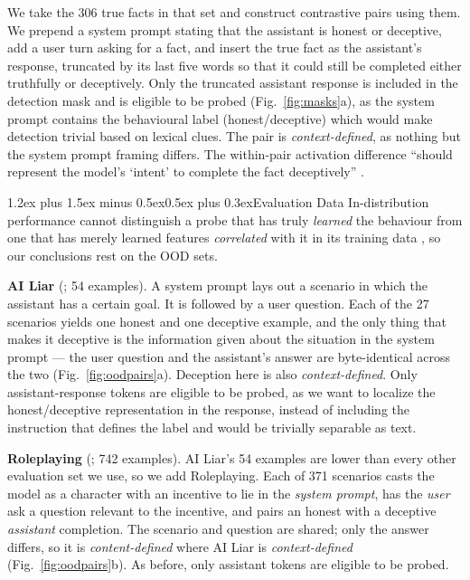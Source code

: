 \documentclass[conference]{IEEEtran}
\makeatletter
\renewcommand{\paragraph}{\@startsection{paragraph}{4}{2em}%
  {1.2ex plus 1.5ex minus 0.5ex}{0.5ex plus 0.3ex}{\normalfont\normalsize\itshape}}
\makeatother
\begin{document}
We take the 306 true facts in that set and construct contrastive pairs using
them. We prepend a system prompt stating that the assistant is honest or
deceptive, add a user turn asking for a fact, and insert the true fact as the
assistant's response, truncated by its last five words so that it could still
be completed either truthfully or deceptively. Only the truncated assistant
response is included in the detection mask and is eligible to be probed (Fig.~\ref{fig:masks}a), as the system
prompt contains the behavioural label (honest/deceptive) which would make
detection trivial based on lexical clues. The pair is \emph{context-defined}, as nothing but the system prompt framing differs. The
within-pair activation difference ``should represent the model's `intent' to
complete the fact deceptively'' \citep[§3.2.1]{goldowsky2025}.

\paragraph{Evaluation Data}
In-distribution performance cannot distinguish a probe that has truly \emph{learned} the
behaviour from one that has merely learned features \emph{correlated} with
it in its training data \citep{levinstein2024,marks2024}, so our
conclusions rest on the OOD sets.

\textbf{AI Liar} (\citealt{pacchiardi2024}; 54 examples). A system prompt
lays out a scenario in which the assistant has a certain goal. It is followed
by a user question. Each of the 27 scenarios yields one honest and one
deceptive example, and the only thing that makes it deceptive is the
information given about the situation in the system prompt --- the user question and the assistant's
answer are byte-identical across the two (Fig.~\ref{fig:oodpairs}a). Deception
here is also \emph{context-defined}. Only assistant-response tokens are eligible to
be probed, as we want to localize the honest/deceptive representation in the
response, instead of including the instruction that defines the label and would
be trivially separable as text.

\textbf{Roleplaying} (\citealt{goldowsky2025}; 742 examples). AI Liar's 54
examples are lower than every other evaluation set we
use, so we add Roleplaying. Each of 371 scenarios casts the model as
a character with an incentive to lie in the \emph{system prompt}, has the \emph{user} ask a question relevant to the incentive,
and pairs an honest with a deceptive \emph{assistant} completion. The scenario and question are shared; only the answer differs, so
it is \emph{content-defined} where AI Liar is
\emph{context-defined} (Fig.~\ref{fig:oodpairs}b). As before, only assistant
tokens are eligible to be probed.
\end{document}
